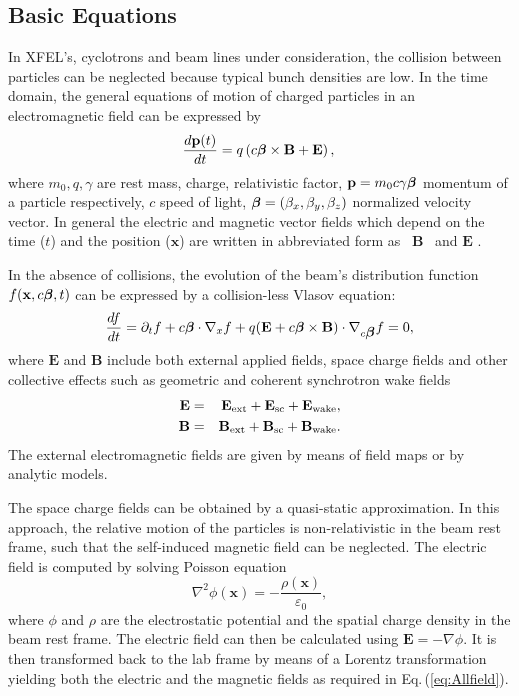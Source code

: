 \documentclass[acus]{JAC2003}
\newcommand{\bs}[1]{\mathbf #1}
\begin{document}
\subsection{Basic Equations}
In XFEL's, cyclotrons and beam lines under consideration, the collision between particles can be neglected because typical bunch densities are low.
In the time domain, the general equations of motion of charged particles in an electromagnetic field can be expressed by
\begin{equation}\label{eq:motion}
  \frac{d\bs{p}(t)}{dt}  = q\left(c\mbox{\boldmath$\beta$}\times \bs{B} + \bs{E}\right), \nonumber \\
\end{equation}
where $m_0, q,\gamma$ are rest mass, charge, relativistic factor, $\bs{p}=m_0 c \gamma \mbox{\boldmath$\beta$}$ momentum of a particle respectively, 
$c$ speed of light, $\mbox{\boldmath$\beta$}=(\beta_x, \beta_y, \beta_z)$ normalized velocity vector. In general the electric and magnetic vector fields which depend on the time ($t$) and the position ($\bs{x}$) are
written in abbreviated form as \mbox{ $\bs{B}$ } and \mbox{$\bs{E}$} .

In the absence of collisions, the evolution of the beam's distribution function $ f(\bs {x},c\mbox{\boldmath$\beta$},t)$ can be expressed by a collision-less Vlasov equation:
\begin{equation}\label{eq:Vlasov}
  \frac{df}{dt}=\partial_t f + c\mbox{\boldmath$\beta$} \cdot \nabla_x f +q(\bs{E}+ c\mbox{\boldmath$\beta$}\times\bs{B})\cdot \nabla_{c\mbox{\boldmath$\beta$}} f  =  0, 
\end{equation}
where $\bs{E}$ and $\bs{B}$ include both external applied fields, space charge fields and other collective effects such as geometric and coherent synchrotron wake fields
\begin{eqnarray}\label{eq:Allfield}
  \bs{E} & = & \bs{E_{\RM{ext}}}+\bs{E_{\RM{sc}}}+\bs{E_{\RM{wake}}}, \nonumber\\    
  \bs{B} & = & \bs{B_{\RM{ext}}}+\bs{B_{\RM{sc}}}+\bs{B_{\RM{wake}}}.
\end{eqnarray}
The external electromagnetic fields are given by means of field maps or by analytic models. 

The space charge fields can be obtained
by a quasi-static approximation. In this approach, the relative motion of the particles is non-relativistic in the beam rest frame, such that the self-induced magnetic field 
can be neglected. The electric field is computed by solving Poisson equation
\begin{equation}\label{eq:Poisson}
  \nabla^{2} \phi(\bs{x}) = - \frac{\rho(\bs{x})}{\varepsilon_0},
\end{equation}
where $\phi$ and $\rho$ are the electrostatic potential and the spatial charge density in the beam rest frame. The electric field can then be calculated using $ \bs{E}=-\nabla\phi$.
It is then transformed back to the lab frame by means of a Lorentz transformation yielding both the electric and the magnetic fields as required in Eq.\,(\ref{eq:Allfield}).
\end{document}
